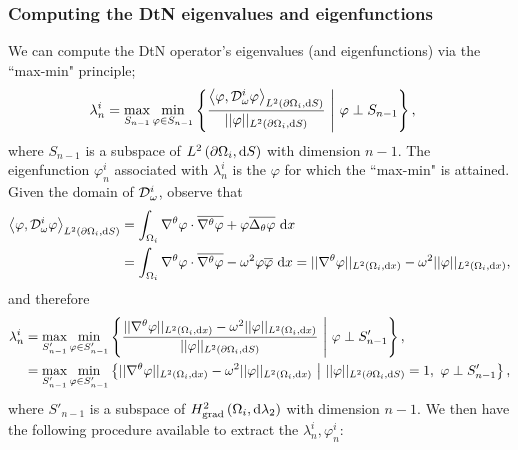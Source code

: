 \subsubsection{Computing the DtN eigenvalues and eigenfunctions} \label{sssec:ComputingDtNEfuncs}
We can compute the DtN operator's eigenvalues (and eigenfunctions) via the ``max-min" principle;
\begin{align*}
	\lambda^i_n &= \max_{S_{n-1}}\min_{\varphi\in S_{n-1}}\left\{  \frac{\left\langle \varphi , \mathcal{D}_{\omega}^i\varphi \right\rangle_{L^{2}\left( \partial\Omega_i,\mathrm{d} S \right)}}{\lvert\lvert \varphi \rvert\rvert_{L^{2}\left( \partial\Omega_i,\mathrm{d} S \right)}} \ \middle\vert \  \varphi\perp S_{n-1} \right\},
\end{align*}
where $S_{n-1}$ is a subspace of $L^{2}\left( \partial\Omega_i,\mathrm{d} S \right)$ with dimension $n-1$.
The eigenfunction $\varphi_n^i$ associated with $\lambda^i_n$ is the $\varphi$ for which the ``max-min" is attained.
Given the domain of $\mathcal{D}_{\omega}^i$, observe that
\begin{align*}
	\left\langle \varphi , \mathcal{D}_{\omega}^i\varphi \right\rangle_{L^{2}\left( \partial\Omega_i,\mathrm{d} S \right)}
	&= \int_{\Omega_i} \nabla^{\theta} \varphi\cdot\overline{\nabla^{\theta} \varphi} + \varphi\overline{\Delta_{\theta} \varphi}  \ \mathrm{d}x \\
	&= \int_{\Omega_i} \nabla^{\theta} \varphi\cdot\overline{\nabla^{\theta} \varphi} - \omega^2 \varphi\overline{\varphi}  \ \mathrm{d}x
	= \lvert\lvert \nabla^{\theta} \varphi \rvert\rvert_{L^{2}\left( \Omega_i,\mathrm{d} x \right)} - \omega^2 \lvert\lvert \varphi \rvert\rvert_{L^{2}\left( \Omega_i,\mathrm{d} x \right)},
\end{align*}
and therefore
\begin{align*}
	\lambda^i_n 
	&= \max_{S'_{n-1}}\min_{\varphi\in S'_{n-1}}\left\{  \frac{\lvert\lvert \nabla^{\theta} \varphi \rvert\rvert_{L^{2}\left( \Omega_i,\mathrm{d} x \right)} - \omega^2 \lvert\lvert \varphi \rvert\rvert_{L^{2}\left( \Omega_i,\mathrm{d} x \right)}}{\lvert\lvert \varphi \rvert\rvert_{L^{2}\left( \partial\Omega_i,\mathrm{d} S \right)}} \ \middle\vert \  \varphi\perp S'_{n-1}  \right\}, \\
	&= \max_{S'_{n-1}}\min_{\varphi\in S'_{n-1}}\left\{  \lvert\lvert \nabla^{\theta} \varphi \rvert\rvert_{L^{2}\left( \Omega_i,\mathrm{d} x \right)} - \omega^2 \lvert\lvert \varphi \rvert\rvert_{L^{2}\left( \Omega_i,\mathrm{d} x \right)} \ \middle\vert \  \lvert\lvert \varphi \rvert\rvert_{L^{2}\left( \partial\Omega_i,\mathrm{d} S \right)}=1, \ \varphi\perp S'_{n-1}  \right\},
\end{align*}
where $S'_{n-1}$ is a subspace of $H^2_\mathrm{grad}\left( \Omega_i, \mathrm{d}\lambda_2 \right)$ with dimension $n-1$.
We then have the following procedure available to extract the $\lambda_n^i, \varphi_n^i$:
